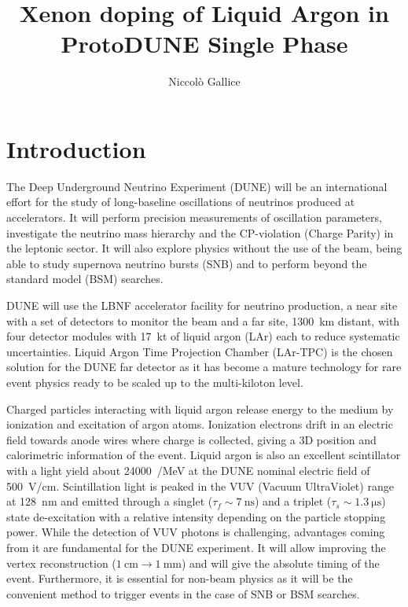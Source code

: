 \documentclass[a4paper]{article}
\title{\boldmath Xenon doping of Liquid Argon in ProtoDUNE Single Phase}
\author[1,2]{Niccol\`o Gallice}
\affiliation[1]{Universit\`a degli Studi di Milano, Dept. of Phsyics, via Celoria 16, Milano 20133, IT}
\affiliation[2]{INFN Sezione di Milano, via Celoria 16, Milano 20133, IT}
\begin{document}
\maketitle
\flushbottom

\section{Introduction}
The Deep Underground Neutrino Experiment (DUNE) \cite{AbiI_2020} will be an international effort for the study of long-baseline oscillations of neutrinos produced at accelerators. It will perform precision measurements of oscillation parameters, investigate the neutrino mass hierarchy and the CP-violation (Charge Parity) in the leptonic sector. It will also explore physics without the use of the beam, being able to study supernova neutrino bursts (SNB) and to perform beyond the standard model (BSM) searches.

DUNE will use the LBNF accelerator facility for neutrino production, a near site with a set of detectors to monitor the beam and a far site, \SI{1300}{\kilo\meter} distant, with four detector modules with \SI{17}{\kilo\tonne} of liquid argon (LAr) each to reduce systematic uncertainties. Liquid Argon Time Projection Chamber (LAr-TPC) is the chosen solution for the DUNE far detector as it has become a mature technology for rare event physics \cite{ICARUS:2004wqc, MicroBooNE:2016pwy, Anderson:2012vc, article} ready to be scaled up to the multi-kiloton level.

Charged particles interacting with liquid argon release energy to the medium by ionization and excitation of argon atoms. Ionization electrons drift in an electric field towards anode wires where charge is collected, giving a 3D position and calorimetric information of the event. Liquid argon is also an excellent scintillator with a light yield about \SI{24000}{\ph/\mega\electronvolt} at the DUNE nominal electric field of \SI{500}{\volt/\centi\meter}. Scintillation light is peaked in the VUV (Vacuum UltraViolet) range at \SI{128}{\nano\meter} and emitted through a singlet ($\tau_f \sim \SI{7}{\nano\second}$) and a triplet ($\tau_s \sim \SI{1.3}{\micro\second}$) state de-excitation with a relative intensity depending on the particle stopping power. While the detection of VUV photons is challenging, advantages coming from it are fundamental for the DUNE experiment. It will allow improving the vertex reconstruction ($\SI{1}{\centi\meter} \xrightarrow{} \SI{1}{\milli\meter}$) and will give the absolute timing of the event. Furthermore, it is essential for non-beam physics as it will be the convenient method to trigger events in the case of SNB or BSM searches.
\end{document}
